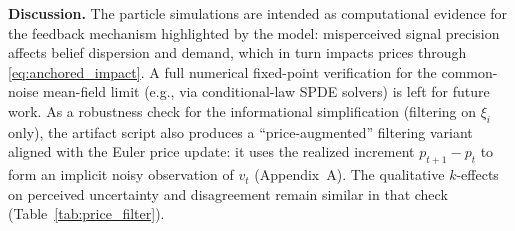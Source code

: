 \textbf{Discussion.} The particle simulations are intended as computational evidence for the feedback mechanism highlighted by the model: misperceived signal precision affects belief dispersion and demand, which in turn impacts prices through \eqref{eq:anchored_impact}. A full numerical fixed-point verification for the common-noise mean-field limit (e.g., via conditional-law SPDE solvers) is left for future work.
As a robustness check for the informational simplification (filtering on $\xi_i$ only), the artifact script also produces a ``price-augmented'' filtering variant aligned with the Euler price update: it uses the realized increment $p_{t+1}-p_t$ to form an implicit noisy observation of $v_t$ (Appendix~A). The qualitative $k$-effects on perceived uncertainty and disagreement remain similar in that check (Table~\ref{tab:price_filter}).
